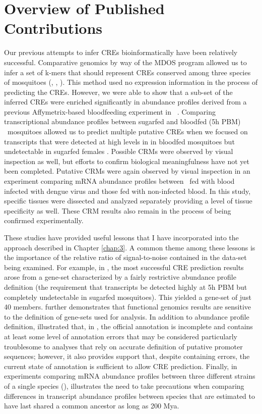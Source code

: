 \chapter{Overview of Published Contributions}


Our previous attempts to infer \glspl{CRE} bioinformatically have been relatively successful.
Comparative genomics by way of the \gls{MDOS} program allowed us to infer a set of k-mers that should represent \glspl{CRE} conserved among three species of mosquitoes (\Aa, \Ag, \Cq).
This method used no expression information in the process of predicting the \glspl{CRE}.
However, we were able to show that a sub-set of the inferred \glspl{CRE} were enriched significantly in abundance profiles derived from a previous Affymetrix-based bloodfeeding experiment in \Ag\ \cite{Marinotti2005,Marinotti2006,Sieglaff2009}.
Comparing transcriptional abundance profiles between sugarfed and bloodfed (5h \gls{PBM}) \Aa\ mosquitoes allowed us to predict multiple putative \glspl{CRE} when we focused on transcripts that were detected at high levels in in bloodfed mosquitoes but undetectable in sugarfed females \cite{Bonizzoni2011}.
Possible \glspl{CRM} were observed by visual inspection as well, but efforts to confirm biological meaningfulness have not yet been completed.
Putative \glspl{CRM} were again observed by visual inspection in an experiment comparing mRNA abundance profiles between \Aa\ fed with blood infected with dengue virus and those fed with non-infected blood.
In this study, specific tissues were dissected and analyzed separately providing a level of tissue specificity as well.
These \gls{CRM} results also remain in the process of being confirmed experimentally.

These studies have provided useful lessons that I have incorporated into the approach described in Chapter \ref{chap:3}.
A common theme among these lessons is the importance of the relative ratio of signal-to-noise contained in the data-set being examined.
For example, in \citet{Bonizzoni2011}, the most successful \gls{CRE} prediction results arose from a gene-set characterized by a fairly restrictive abundance profile definition (the requirement that transcripts be detected highly at 5h \gls{PBM} but completely undetectable in sugarfed mosquitoes).
This yielded a gene-set of just 40 members.
\citet{bonizzoni2012complex} further demonstrates that \gls{functional genomics} results are sensitive to the definition of gene-sets used for analysis.
In addition to abundance profile definition, \citet{Bonizzoni2011} illustrated that, in \Aa, the official annotation is incomplete and contains at least some level of annotation errors that may be considered particularly troublesome to analyses that rely on accurate definition of putative promoter sequences; however, it also provides support that, despite containing errors, the current state of annotation is sufficient to allow \gls{CRE} prediction.
Finally, in experiments comparing mRNA abundance profiles between three different strains of a single species (\Aa), \citet{bonizzoni2012strain} illustrates the need to take precautions when comparing differences in transcript abundance profiles between species that are estimated to have last shared a common ancestor as long as 200 \gls{Mya}.



